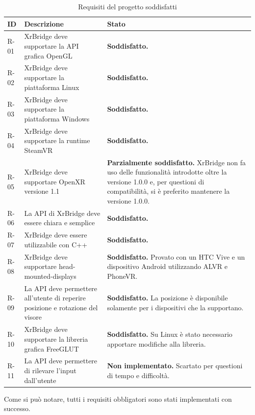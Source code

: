 \documentclass[twoside]{supsistudent}
\begin{document}
\begin{table}[H]
  \caption{Requisiti del progetto soddisfatti}
  \begin{center}
    \begin{tabular}{ | m{1cm} | m{6cm} | m{6cm} | }
      \hline
      ID   & Descrizione & Stato \\
      \hline
      R-01 & XrBridge deve supportare la API grafica OpenGL & \textbf{Soddisfatto.} \\
      \hline
      R-02 & XrBridge deve supportare la piattaforma Linux & \textbf{Soddisfatto.} \\
      \hline
      R-03 & XrBridge deve supportare la piattaforma Windows & \textbf{Soddisfatto.} \\
      \hline
      R-04 & XrBridge deve supportare la runtime SteamVR & \textbf{Soddisfatto.} \\
      \hline
      R-05 & XrBridge deve supportare OpenXR versione 1.1 & \textbf{Parzialmente soddisfatto.} XrBridge non fa uso delle funzionalità introdotte oltre la versione 1.0.0 e, per questioni di compatibilità, si è preferito mantenere la versione 1.0.0. \\
      \hline
      R-06 & La API di XrBridge deve essere chiara e semplice & \textbf{Soddisfatto.} \\
      \hline
      R-07 & XrBridge deve essere utilizzabile con C++ & \textbf{Soddisfatto.} \\
      \hline
      R-08 & XrBridge deve supportare head-mounted-displays & \textbf{Soddisfatto.} Provato con un HTC Vive e un dispositivo Android utilizzando ALVR e PhoneVR. \\
      \hline
      R-09 & La API deve permettere all'utente di reperire posizione e rotazione del visore & \textbf{Soddisfatto.} La posizione è disponibile solamente per i dispositivi che la supportano. \\
      \hline
      R-10 & XrBridge deve supportare la libreria grafica FreeGLUT & \textbf{Soddisfatto.} Su Linux è stato necessario apportare modifiche alla libreria. \\
      \hline
      R-11 & La API deve permettere di rilevare l'input dall'utente & \textbf{Non implementato.} Scartato per questioni di tempo e difficoltà. \\
      \hline
    \end{tabular}
  \end{center}
\end{table}

Come si può notare, tutti i requisiti obbligatori sono stati implementati con successo.
\end{document}

